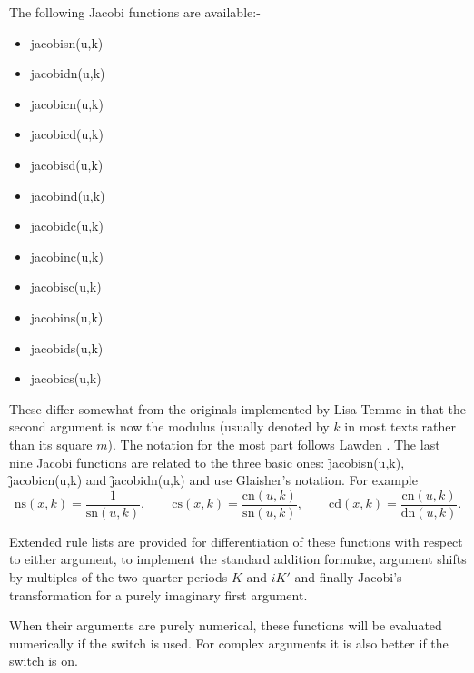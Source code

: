 The following Jacobi functions are available:-
\hypertarget{operator:JACOBISN}{}
\hypertarget{operator:JACOBICN}{}
\hypertarget{operator:JACOBIDN}{}
\hypertarget{operator:Jacobisd}{}
\hypertarget{operator:Jacobind}{}
\hypertarget{operator:Jacobidc}{}
\hypertarget{operator:Jacobinc}{}
\hypertarget{operator:Jacobisc}{}
\hypertarget{operator:Jacobins}{}
\hypertarget{operator:Jacobids}{}
\hypertarget{operator:Jacobics}{}
\begin{itemize}
\item jacobisn(u,k)
\item jacobidn(u,k)
\item jacobicn(u,k)
\item jacobicd(u,k)
\item jacobisd(u,k)
\item jacobind(u,k)
\item jacobidc(u,k)
\item jacobinc(u,k)
\item jacobisc(u,k)
\item jacobins(u,k)
\item jacobids(u,k)
\item jacobics(u,k)
\end{itemize}

These differ somewhat from the originals implemented by Lisa Temme in that
the second argument is now the modulus (usually denoted by $k$ in most texts
rather than its square $m$).  The notation for the most part follows  Lawden
\cite{Lawden:89}. The last nine Jacobi functions are related to the three
basic ones: \f{jacobisn(u,k)}, \f{jacobicn(u,k)} and \f{jacobidn(u,k)} and
use Glaisher's notation. For example
\[ \mathrm{ns}(x,k) = \frac{1}{\mathrm{sn}(u,k)}, \qquad
\mathrm{cs}(x,k) = \frac{\mathrm{cn}(u,k)}{\mathrm{sn}(u,k)}, \qquad
\mathrm{cd}(x,k) = \frac{\mathrm{cn}(u,k)}{\mathrm{dn}(u,k)}. \]

Extended rule lists are provided for differentiation of these functions with
respect to either argument, to implement the standard addition formulae,
argument shifts by multiples of the two quarter-periods $K$ and $iK'$ and
finally Jacobi's transformation for a purely imaginary first argument.

When their arguments are purely numerical, these functions  will be evaluated
numerically if the  switch is used. For
complex arguments it is also better if the  switch is on.


